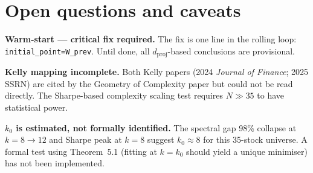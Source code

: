 \documentclass[11pt,a4paper]{article}
\begin{document}
\section*{Open questions and caveats}

\textbf{Warm-start — critical fix required.}
The fix is one line in the rolling loop: \texttt{initial\_point=W\_prev}.
Until done, all $d_{\mathrm{proj}}$-based conclusions are provisional.

\medskip
\textbf{Kelly mapping incomplete.}
Both Kelly papers (2024 \emph{Journal of Finance}; 2025 SSRN) are cited by the
Geometry of Complexity paper but could not be read directly.
The Sharpe-based complexity scaling test requires $N\gg 35$ to have statistical power.

\medskip
\textbf{$k_0$ is estimated, not formally identified.}
The spectral gap 98\% collapse at $k=8\to12$ and Sharpe peak at $k=8$
suggest $k_0\approx 8$ for this 35-stock universe.
A formal test using Theorem~5.1 (fitting at $k=k_0$ should yield a unique minimiser)
has not been implemented.
\end{document}
